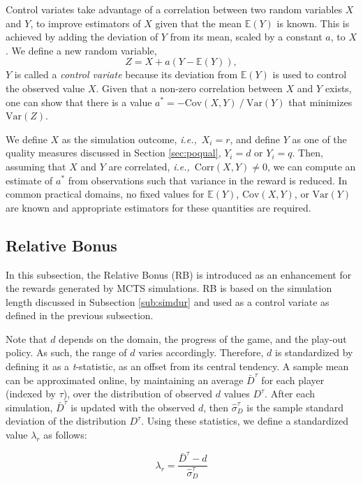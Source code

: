 \documentclass{ecai2014}
\newcommand{\ie}{{\it i.e.,}~}
\newcommand{\E}[1]{\mathbb{E}\left( #1 \right)}
\newcommand{\Var}[1]{\mathrm{Var}\left( #1 \right)}
\newcommand{\Cov}[1]{\mathrm{Cov}\left( #1 \right)}
\newcommand{\Corr}[1]{\mathrm{Corr}\left( #1 \right)}
\begin{document}
Control variates take advantage of a correlation between two random variables $X$ and $Y$, to improve estimators of $X$ given that the mean $\E{Y}$ is known. This is achieved by adding the deviation of $Y$ from its mean, scaled by a constant $a$, to $X$. We define a new random variable, 
\begin{equation}
Z=X+a\left(Y-\E{Y}\right),
\label{eq:cv}
\end{equation}
$Y$ is called a {\it control variate} because its deviation from $\E{Y}$ is used to control the observed value $X$. Given that a non-zero correlation between $X$ and $Y$ exists, one can show that there is a value $a^*=-\Cov{X,Y}\mathbin{/}\Var{Y}$ that minimizes $\Var{Z}$.

We define $X$ as the simulation outcome, \ie $X_i=r$, and define $Y$ as one of the quality measures discussed in Section \ref{sec:poqual}, $Y_i=d$ or $Y_i=q$. Then, assuming that $X$ and $Y$ are correlated, \ie $\Corr{X,Y}\neq0$, we can compute an estimate of $a^*$ from observations such that variance in the reward is reduced. In common practical domains, no fixed values for $\E{Y}$, $\Cov{X,Y}$, or $\Var{Y}$ are known and appropriate estimators for these quantities are required.

\subsection{Relative Bonus}
\label{subsec:rb}
In this subsection, the Relative Bonus (RB) is introduced as an enhancement for the rewards generated by MCTS simulations. RB is based on the simulation length discussed in Subsection \ref{sub:simdur} and used as a control variate as defined in the previous subsection.

Note that $d$ depends on the domain, the progress of the game, and the play-out policy. As such, the range of $d$ varies accordingly. Therefore, $d$ is standardized by defining it as a \emph{t}-statistic, as an offset from its central tendency. A sample mean can be approximated online, by maintaining an average $\bar{D}^\tau$ for each player (indexed by $\tau$), over the distribution of observed $d$ values $D^\tau$. After each simulation, $\bar{D}^\tau$ is updated with the observed $d$, then $\hat{\sigma}^\tau_D$ is the sample standard deviation of the distribution $D^\tau$. Using these statistics, we define a standardized value $\lambda_r$ as follows:

\begin{equation}
\lambda_r = \frac{\bar{D}^\tau - d}{\hat{\sigma}^\tau_D}
\label{eq:rb_norm}
\end{equation}
\end{document}
